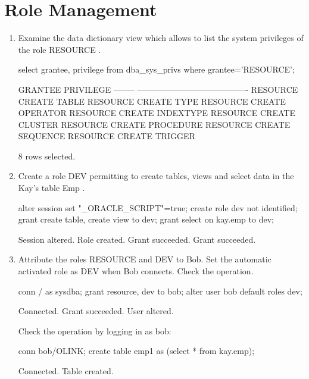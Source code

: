 \documentclass{article}
\begin{document}
\section{Role Management}
\begin{enumerate}
\item{Examine the data dictionary view which allows to list the system privileges of the role RESOURCE .}
\begin{sqlshell}
select grantee, privilege from dba_sys_privs where grantee='RESOURCE';
\end{sqlshell}
\begin{messageshell}
GRANTEE  PRIVILEGE
-------- ----------------------------------------
RESOURCE CREATE TABLE
RESOURCE CREATE TYPE
RESOURCE CREATE OPERATOR
RESOURCE CREATE INDEXTYPE
RESOURCE CREATE CLUSTER
RESOURCE CREATE PROCEDURE
RESOURCE CREATE SEQUENCE
RESOURCE CREATE TRIGGER

8 rows selected.
\end{messageshell}

\item{Create a role DEV permitting to create tables, views and select data in the Kay’s table Emp .}
\begin{sqlshell}
alter session set "_ORACLE_SCRIPT"=true;  
create role dev not identified;
grant create table, create view to dev;
grant select on kay.emp to dev;
\end{sqlshell}
\begin{messageshell}
Session altered.
Role created.
Grant succeeded.
Grant succeeded.
\end{messageshell}

\item{Attribute the roles RESOURCE and DEV to Bob. Set the automatic activated role as DEV when Bob connects. Check the operation.}
\begin{sqlshell}
conn / as sysdba;
grant resource, dev to bob;
alter user bob default roles dev;
\end{sqlshell}
\begin{messageshell}
Connected.
Grant succeeded.
User altered.
\end{messageshell}
Check the operation by logging in as bob:
\begin{sqlshell}
conn bob/OLINK;
create table emp1 as (select * from kay.emp);
\end{sqlshell}
\begin{messageshell}
Connected.
Table created.
\end{messageshell}


\end{enumerate}
\end{document}
